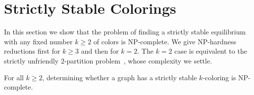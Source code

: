 \section{Strictly Stable Colorings}

In this section we show that the problem of finding a strictly stable
equilibrium
with any fixed number $k \geq 2$ of colors is NP-complete.  We give NP-hardness
reductions first for $k \geq 3$ and then for $k=2$.  The $k=2$ case is
equivalent to the strictly unfriendly $2$-partition problem~\cite{ShafiqueD09},
whose complexity we settle.

\begin{theorem} 
For all $k \geq 2$, determining whether a graph has a strictly stable
$k$-coloring is NP-complete.  
\end{theorem}

